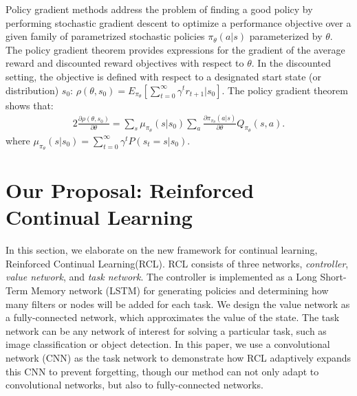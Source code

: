 \documentclass{article}
\begin{document}
Policy gradient methods address the problem of finding a good policy by performing stochastic gradient descent to optimize a performance objective over a given family of parametrized stochastic policies $\pi_\theta (a|s)$ parameterized by $\theta$. The policy
gradient theorem \cite{sutton2} provides expressions for the gradient of the average reward and discounted reward objectives with respect to $\theta$. In the discounted setting, the objective is defined with respect to a designated start state (or distribution) $s_0$: $\rho(\theta,s_0) = E_{\pi_\theta}[\sum_{t=0}^\infty\gamma^{t}r_{t+1}|s_0 ]$. The policy gradient theorem shows
that:
\begin{alignat}{2}  %
\label{eq01}
\frac{\partial \rho(\theta,s_0)}{\partial \theta} = \sum_s \mu_{\pi_\theta}(s|s_0)\sum_a\frac{\partial \pi_{\pi_\theta}(a|s)}{\partial \theta}Q_{\pi_\theta}(s,a).
\end{alignat}
where $\mu_{\pi_\theta}(s|s_0)= \sum_{t=0}^\infty\gamma^tP(s_t = s|s_0) $.



\section{Our Proposal: Reinforced Continual Learning}
\label{sec:rcl}
In this section, we elaborate on the new framework for continual learning, Reinforced Continual Learning(RCL). RCL consists of three networks,  \emph{controller},  \emph{value network}, and  \emph{ task network}.  The controller is implemented as a Long Short-Term Memory network (LSTM) for generating policies and determining how many filters or nodes will be added for each task. We design the value network as a fully-connected network, which approximates the value of the state. The task network can be any network of interest for solving a particular task, such as image classification or object detection.  In this paper, we  use a convolutional network (CNN) as the task network to demonstrate how RCL adaptively expands this CNN to prevent forgetting, though our method can not only adapt to convolutional networks, but also to fully-connected networks.
\end{document}
